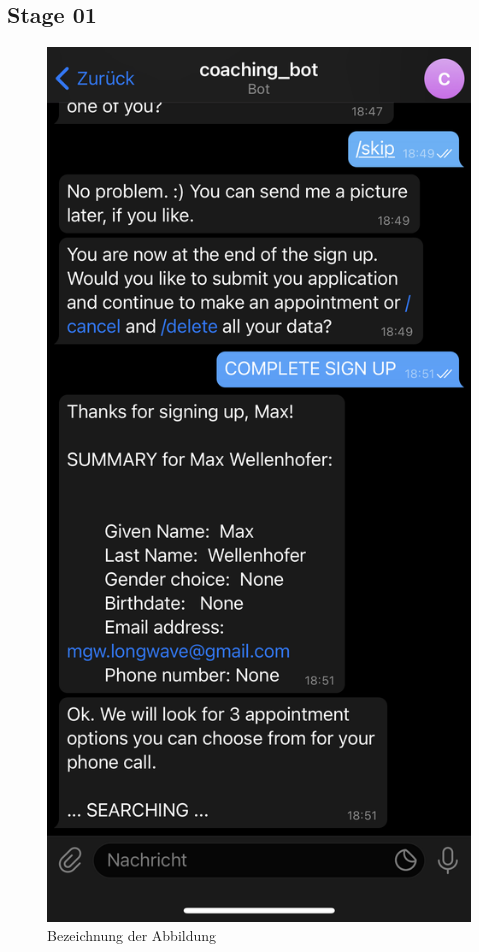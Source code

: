 \subsection{Stage 01}
\begin{figure} %
	\centering
	\includegraphics{images/coaching_bot_dummy_screenshot.jpeg}
	\caption{Bezeichnung der Abbildung}
	\label{a2}
\end{figure}


